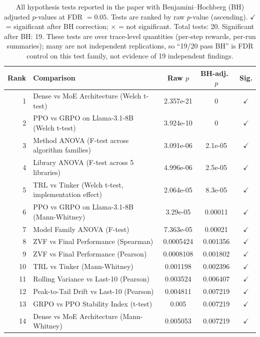 \begin{table}[!ht]
\centering
\caption{All hypothesis tests reported in the paper with Benjamini--Hochberg (BH) adjusted
         $p$-values at FDR $= 0.05$.  Tests are ranked by raw $p$-value (ascending).
         $\checkmark$ = significant after BH correction; $\times$ = not significant.
         Total tests: 20.  Significant after BH: 19.  These tests are over
         trace-level quantities (per-step rewards, per-run summaries); many are
         not independent replications, so ``19/20 pass BH'' is FDR control on
         this test family, not evidence of 19 independent findings.}
\label{tab:bh-pvalues}
\scriptsize
\begin{tabular}{@{}rp{6.2cm}ccc@{}}
\toprule
Rank & Comparison & Raw $p$ & BH-adj.\ $p$ & Sig. \\
\midrule
        1 & Dense vs MoE Architecture (Welch t-test) & 2.357e-21 & 0 & $\checkmark$ \\
        2 & PPO vs GRPO on Llama-3.1-8B (Welch t-test) & 3.924e-10 & 0 & $\checkmark$ \\
        3 & Method ANOVA (F-test across algorithm families) & 3.091e-06 & 2.1e-05 & $\checkmark$ \\
        4 & Library ANOVA (F-test across 5 libraries) & 4.996e-06 & 2.5e-05 & $\checkmark$ \\
        5 & TRL vs Tinker (Welch t-test, implementation effect) & 2.064e-05 & 8.3e-05 & $\checkmark$ \\
        6 & PPO vs GRPO on Llama-3.1-8B (Mann-Whitney) & 3.29e-05 & 0.00011 & $\checkmark$ \\
        7 & Model Family ANOVA (F-test) & 7.363e-05 & 0.00021 & $\checkmark$ \\
        8 & ZVF vs Final Performance (Spearman) & 0.0005424 & 0.001356 & $\checkmark$ \\
        9 & ZVF vs Final Performance (Pearson) & 0.0008108 & 0.001802 & $\checkmark$ \\
        10 & TRL vs Tinker (Mann-Whitney) & 0.001198 & 0.002396 & $\checkmark$ \\
        11 & Rolling Variance vs Last-10 (Pearson) & 0.003524 & 0.006407 & $\checkmark$ \\
        12 & Peak-to-Tail Drift vs Last-10 (Pearson) & 0.004811 & 0.007219 & $\checkmark$ \\
        13 & GRPO vs PPO Stability Index (t-test) & 0.005 & 0.007219 & $\checkmark$ \\
        14 & Dense vs MoE Architecture (Mann-Whitney) & 0.005053 & 0.007219 & $\checkmark$ \\

\end{tabular}
\end{table}

